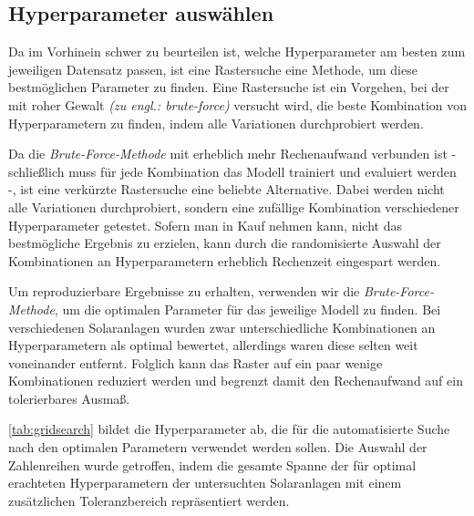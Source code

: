 \documentclass[12pt, a4paper]{article}
\begin{document}
%

\subsection{Hyperparameter auswählen}

Da im Vorhinein schwer zu beurteilen ist, welche Hyperparameter am besten zum jeweiligen Datensatz passen, ist eine Rastersuche eine Methode, um diese bestmöglichen Parameter zu finden. Eine Rastersuche ist ein Vorgehen, bei der mit roher Gewalt \textit{(zu engl.: brute-force)} versucht wird, die beste Kombination von Hyperparametern zu finden, indem alle Variationen durchprobiert werden.

Da die \textit{Brute-Force-Methode} mit erheblich mehr Rechenaufwand verbunden ist - schließlich muss für jede Kombination das Modell trainiert und evaluiert werden -, ist eine verkürzte Rastersuche eine beliebte Alternative. Dabei werden nicht alle Variationen durchprobiert, sondern eine zufällige Kombination verschiedener Hyperparameter getestet. Sofern man in Kauf nehmen kann, nicht das bestmögliche Ergebnis zu erzielen, kann durch die randomisierte Auswahl der Kombinationen an Hyperparametern erheblich Rechenzeit eingespart werden.

Um reproduzierbare Ergebnisse zu erhalten, verwenden wir die \textit{Brute-Force-Methode}, um die optimalen Parameter für das jeweilige Modell zu finden. Bei verschiedenen Solaranlagen wurden zwar unterschiedliche Kombinationen an Hyperparametern als optimal bewertet, allerdings waren diese selten weit voneinander entfernt. Folglich kann das Raster auf ein paar wenige Kombinationen reduziert werden und begrenzt damit den Rechenaufwand auf ein tolerierbares Ausmaß.

\autoref{tab:gridsearch} bildet die Hyperparameter ab, die für die automatisierte Suche nach den optimalen Parametern verwendet werden sollen. Die Auswahl der Zahlenreihen wurde getroffen, indem die gesamte Spanne der für optimal erachteten Hyperparametern der untersuchten Solaranlagen mit einem zusätzlichen Toleranzbereich repräsentiert werden. 
\end{document}
